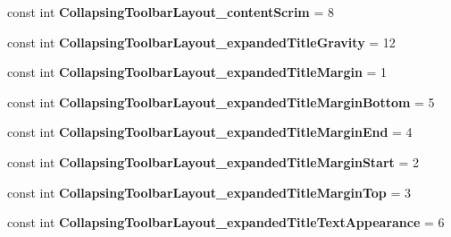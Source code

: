 \begin{DoxyCompactItemize}
const int {\bfseries Collapsing\+Toolbar\+Layout\+\_\+content\+Scrim} = 8
\item 
\mbox{\label{class_pinned_app_1_1_droid_1_1_resource_1_1_styleable_a115e99e3795e6710d24859689eb704bd}} 
const int {\bfseries Collapsing\+Toolbar\+Layout\+\_\+expanded\+Title\+Gravity} = 12
\item 
\mbox{\label{class_pinned_app_1_1_droid_1_1_resource_1_1_styleable_a825a373cf7e0c0374d67826630c016f6}} 
const int {\bfseries Collapsing\+Toolbar\+Layout\+\_\+expanded\+Title\+Margin} = 1
\item 
\mbox{\label{class_pinned_app_1_1_droid_1_1_resource_1_1_styleable_ae3b7e0f2e426a1ba6675c62eac63f970}} 
const int {\bfseries Collapsing\+Toolbar\+Layout\+\_\+expanded\+Title\+Margin\+Bottom} = 5
\item 
\mbox{\label{class_pinned_app_1_1_droid_1_1_resource_1_1_styleable_ad3c6545abc10565522366b6a3e1074bb}} 
const int {\bfseries Collapsing\+Toolbar\+Layout\+\_\+expanded\+Title\+Margin\+End} = 4
\item 
\mbox{\label{class_pinned_app_1_1_droid_1_1_resource_1_1_styleable_a341301b43f196fb62f2778ffab3218ed}} 
const int {\bfseries Collapsing\+Toolbar\+Layout\+\_\+expanded\+Title\+Margin\+Start} = 2
\item 
\mbox{\label{class_pinned_app_1_1_droid_1_1_resource_1_1_styleable_a186aa4b8f7b1125efbf4d9ea1b1a5bb3}} 
const int {\bfseries Collapsing\+Toolbar\+Layout\+\_\+expanded\+Title\+Margin\+Top} = 3
\item 
\mbox{\label{class_pinned_app_1_1_droid_1_1_resource_1_1_styleable_aa60801c136293f5b3755c6c8fc3aad57}} 
const int {\bfseries Collapsing\+Toolbar\+Layout\+\_\+expanded\+Title\+Text\+Appearance} = 6
\item 
\mbox{\label{class_pinned_app_1_1_droid_1_1_resource_1_1_styleable_ae4120875b107d90bb9057e93ed5f4a36}} 

\end{DoxyCompactItemize}
